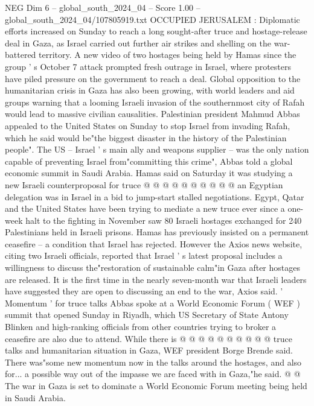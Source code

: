 \begin{textsample}{NEG Dim 6 – global\_south\_2024\_04 – Score 1.00 – global\_south\_2024\_04/107805919.txt}  \label{ex:f6_neg_364}
OCCUPIED JERUSALEM : Diplomatic efforts increased on Sunday to reach a long sought-after truce and hostage-release deal in Gaza, as Israel carried out further air strikes and shelling on the war-battered territory.
A new video of two hostages being held by Hamas since the group ' s October 7 attack prompted fresh outrage in Israel, where protesters have piled pressure on the government to reach a deal.
Global opposition to the humanitarian crisis in Gaza has also been growing, with world leaders and aid groups warning that a looming Israeli invasion of the southernmost city of Rafah would lead to massive civilian causalities.
Palestinian president Mahmud Abbas appealed to the United States on Sunday to stop Israel from invading Rafah, which he said would be"the biggest disaster in the history of the Palestinian people".
The US -- Israel ' s main ally and weapons supplier -- was the only nation capable of preventing Israel from"committing this crime", Abbas told a global economic summit in Saudi Arabia.
Hamas said on Saturday it was studying a new Israeli counterproposal for truce @ @ @ @ @ @ @ @ @ @ an Egyptian delegation was in Israel in a bid to jump-start stalled negotiations.
Egypt, Qatar and the United States have been trying to mediate a new truce ever since a one-week halt to the fighting in November saw 80 Israeli hostages exchanged for 240 Palestinians held in Israeli prisons.
Hamas has previously insisted on a permanent ceasefire -- a condition that Israel has rejected.
However the Axios news website, citing two Israeli officials, reported that Israel ' s latest proposal includes a willingness to discuss the"restoration of sustainable calm"in Gaza after hostages are released.
It is the first time in the nearly seven-month war that Israeli leaders have suggested they are open to discussing an end to the war, Axios said. ' Momentum ' for truce talks Abbas spoke at a World Economic Forum ( WEF ) summit that opened Sunday in Riyadh, which US Secretary of State Antony Blinken and high-ranking officials from other countries trying to broker a ceasefire are also due to attend.
While there is @ @ @ @ @ @ @ @ @ @ truce talks and humanitarian situation in Gaza, WEF president Borge Brende said.
There was"some new momentum now in the talks around the hostages, and also for... a possible way out of the impasse we are faced with in Gaza,"he said. @ @ The war in Gaza is set to dominate a World Economic Forum meeting being held in Saudi Arabia.

\end{textsample}
